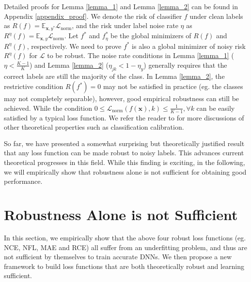 \documentclass{article}
\newcommand{\E}{\mathbb{E}}
\def \xx {{\bm{x}}}
\def \L  {\mathcal{L}}
\begin{document}
Detailed proofs for Lemma \ref{lemma_1} and Lemma \ref{lemma_2} can be found in Appendix \ref{appendix_proof}. 
We denote the risk of classifier $f$ under clean labels as $R(f)=\E_{\xx, y^{*}}\L_{\text{norm}}$, and the risk under label noise rate $\eta$ as $R^{\eta}(f)=\E_{\xx, y} \L_{\text{norm}}$. Let $f^*$ and $f_{\eta}^*$ be the global minimizers of $R(f)$ and $R^{\eta}(f)$, respectively. We need to prove $f^*$ is also a global minimizer of noisy risk $R^{\eta}(f)$ for $\L$ to be robust.  
The noise rate conditions in Lemma \ref{lemma_1} ($\eta < \frac{K-1}{K}$) and Lemma \ref{lemma_2} ($\eta_{jk} < 1- \eta_y$) generally requires that the correct labels are still the majority of the class. 
In Lemma \ref{lemma_2}, the restrictive condition $R(f^{*})=0$ may not be satisfied in practice (eg. the classes may not completely separable), however, good empirical robustness can still be achieved.
While the condition $0 \leq \L_{\text{norm}}(f(\xx), k) \leq \frac{1}{K-1}, \forall k$ can be easily satisfied by a typical loss function. 
We refer the reader to \cite{charoenphakdee2019symmetric} for more discussions of other theoretical properties such as classification calibration.

So far, we have presented a somewhat surprising but theoretically justified result that any loss function can be made robust to noisy labels. This advances current theoretical progresses in this field. While this finding is exciting, in the following, we will empirically show that robustness alone is not sufficient for obtaining good performance.

\section{Robustness Alone is not Sufficient}\label{sec:pos_neg}
In this section, we empirically show that the above four robust loss functions (eg. NCE, NFL, MAE and RCE) all suffer from an underfitting problem, and thus are not sufficient by themselves to train accurate DNNs. We then propose a new framework to build loss functions that are both theoretically robust and learning sufficient.
\end{document}
